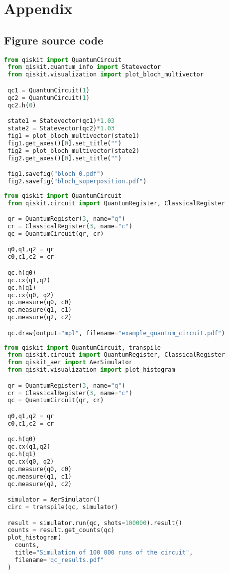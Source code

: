\chapter{Appendix}
\section{Figure source code} \label{sec:figure_sourcecode}
  \begin{lstlisting}[language=Python,caption=Source code for Figure \ref{fig:bloch_qubits},label=lst:bloch_source]
 from qiskit import QuantumCircuit
 from qiskit.quantum_info import Statevector
 from qiskit.visualization import plot_bloch_multivector

 qc1 = QuantumCircuit(1)
 qc2 = QuantumCircuit(1)
 qc2.h(0)

 state1 = Statevector(qc1)*1.03
 state2 = Statevector(qc2)*1.03
 fig1 = plot_bloch_multivector(state1)
 fig1.get_axes()[0].set_title("")
 fig2 = plot_bloch_multivector(state2)
 fig2.get_axes()[0].set_title("")

 fig1.savefig("bloch_0.pdf")
 fig2.savefig("bloch_superposition.pdf")
  \end{lstlisting}
  \begin{lstlisting}[language=Python,caption=Source code for Figure \ref{fig:example_quantum_circuit},label=lst:example_circuit_source]
 from qiskit import QuantumCircuit
 from qiskit.circuit import QuantumRegister, ClassicalRegister

 qr = QuantumRegister(3, name="q")
 cr = ClassicalRegister(3, name="c")
 qc = QuantumCircuit(qr, cr)

 q0,q1,q2 = qr
 c0,c1,c2 = cr

 qc.h(q0)
 qc.cx(q1,q2)
 qc.h(q1)
 qc.cx(q0, q2)
 qc.measure(q0, c0)
 qc.measure(q1, c1)
 qc.measure(q2, c2)

 qc.draw(output="mpl", filename="example_quantum_circuit.pdf")
  \end{lstlisting}
  \begin{lstlisting}[language=Python,caption=Source code for Figure \ref{fig:example_circuit_results},label=lst:circuit_results_source]
 from qiskit import QuantumCircuit, transpile
 from qiskit.circuit import QuantumRegister, ClassicalRegister
 from qiskit_aer import AerSimulator
 from qiskit.visualization import plot_histogram

 qr = QuantumRegister(3, name="q")
 cr = ClassicalRegister(3, name="c")
 qc = QuantumCircuit(qr, cr)

 q0,q1,q2 = qr
 c0,c1,c2 = cr

 qc.h(q0)
 qc.cx(q1,q2)
 qc.h(q1)
 qc.cx(q0, q2)
 qc.measure(q0, c0)
 qc.measure(q1, c1)
 qc.measure(q2, c2)

 simulator = AerSimulator()
 circ = transpile(qc, simulator)

 result = simulator.run(qc, shots=100000).result()
 counts = result.get_counts(qc)
 plot_histogram(
   counts,
   title="Simulation of 100 000 runs of the circuit",
   filename="qc_results.pdf"
 )
  \end{lstlisting}
